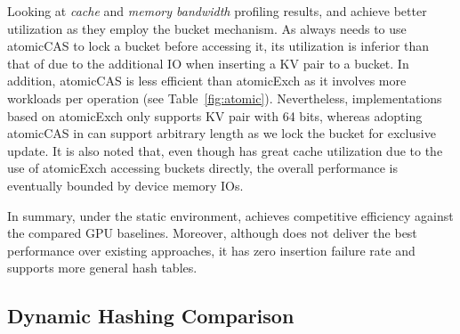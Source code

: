 Looking at \emph{cache} and \emph{memory bandwidth} profiling results, \megakv and \voter achieve better utilization as they employ the bucket mechanism.
As \voter always needs to use atomicCAS to lock a bucket before accessing it, its utilization is inferior than that of \megakv due to the additional IO when inserting a KV pair to a bucket. In addition, atomicCAS is less efficient than atomicExch as it involves more workloads per operation (see Table~\ref{fig:atomic}). Nevertheless, implementations based on atomicExch only supports KV pair with 64 bits, whereas adopting atomicCAS in \voter can support arbitrary length as we lock the bucket for exclusive update.
It is also noted that, even though \megakv has great cache utilization due to the use of atomicExch accessing buckets directly, the overall performance is eventually bounded by device memory IOs. 

In summary, under the static environment, \voter achieves competitive efficiency against the compared GPU baselines. Moreover, although \voter does not deliver the best performance over existing approaches, it has zero insertion failure rate and supports more general hash tables.






\subsection{Dynamic Hashing Comparison}\label{sec:exp:dynamic}

